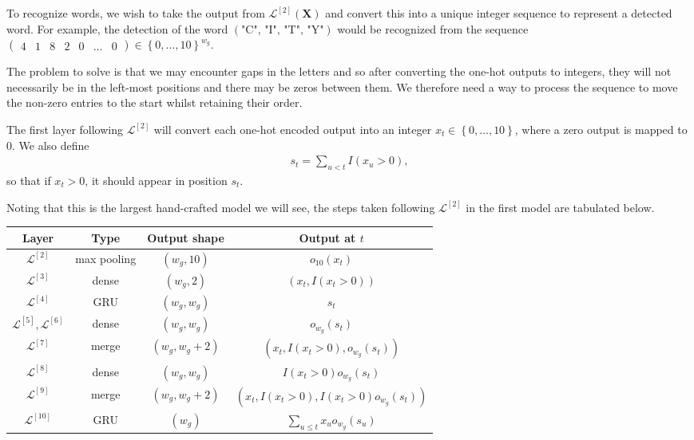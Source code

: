 \documentclass{somasmsc}
\begin{document}
To recognize words, we wish to take the output from $\mathcal{L}^{\left[2\right]}\left(\mathbf{X}\right)$ and convert this into a unique integer sequence to represent a detected word. For example, the detection of the word $\left(\text{"C", "I", "T", "Y"}\right)$ would be recognized from the sequence
$\begin{pmatrix}
    4 & 1 & 8 & 2 & 0 & \dots & 0
\end{pmatrix} \in \left\{0, \dots, 10\right\}^{w_g}$.

The problem to solve is that we may encounter gaps in the letters and so after converting the one-hot outputs to integers, they will not necessarily be in the left-most positions and there may be zeros between them. We therefore need a way to process the sequence to move the non-zero entries to the start whilst retaining their order.

The first layer following $\mathcal{L}^{\left[2\right]}$ will convert each one-hot encoded output into an integer $x_t \in \left\{0, \dots, 10\right\}$, where a zero output is mapped to 0. We also define
\begin{align*}
    s_t = \sum_{u < t} I(x_u > 0),
\end{align*}
so that if $x_t > 0$, it should appear in position $s_t$.

Noting that this is the largest hand-crafted model we will see, the steps taken following $\mathcal{L}^{\left[2\right]}$ in the first model are tabulated below.

\begin{table}[h!]
\centering
\begin{tabular}{ |c|c|c|c| }
 \hline
  Layer & Type & Output shape & Output at $t$ \\
 \hline
 $\mathcal{L}^{\left[2\right]}$ & max pooling & $\left(w_g, 10\right)$   & $o_{10}(x_t)$ \\
 $\mathcal{L}^{\left[3\right]}$ & dense & $\left(w_g, 2\right)$ & $\left(x_t, I(x_t > 0)\right)$ \\
 $\mathcal{L}^{\left[4\right]}$ & GRU & $\left(w_g, w_g\right)$  & $s_t$ \\
 $\mathcal{L}^{\left[5\right]}, \mathcal{L}^{\left[6\right]}$ & dense & $\left(w_g, w_g\right)$  & $o_{w_g}(s_t)$ \\
 $\mathcal{L}^{\left[7\right]}$ & merge & $\left(w_g, w_g + 2\right)$ & $\left(x_t, I(x_t > 0), o_{w_g}(s_t)\right)$ \\
 $\mathcal{L}^{\left[8\right]}$ & dense & $\left(w_g, w_g\right)$ & $I(x_t > 0) o_{w_g}(s_t)$ \\
 $\mathcal{L}^{\left[9\right]}$ & merge & $\left(w_g, w_g + 2\right)$ & $\left(x_t, I(x_t > 0), I(x_t > 0) o_{w_g}(s_t)\right)$ \\
 $\mathcal{L}^{\left[10\right]}$ & GRU & $\left(w_g\right)$ & $\sum_{u \leq t} x_u o_{w_g}(s_u)$ \\
 \hline
\end{tabular}
\label{letters:t1}
\end{table}
\end{document}
